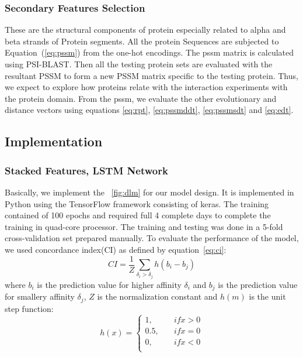 \subsubsection{Secondary Features Selection}
These are the structural components of protein especially related to alpha and beta strands of Protein segments. All the protein Sequences are subjected to Equation~(\ref{eq:pssm}) from the one-hot encodings. The \acrshort{pssm} matrix is calculated using PSI-BLAST\cite{Schaffer2001}. Then all the testing protein sets are evaluated with the resultant PSSM to form a new PSSM matrix specific to the testing protein. Thus, we expect to explore how proteins relate with the interaction experiments with the protein domain. From the \acrshort{pssm}, we evaluate the other evolutionary and distance vectors using equations \ref{eq:rpt}, \ref{eq:pssmddt}, \ref{eq:pssmsdt} and \ref{eq:edt}.

\subsection{Implementation}

\subsubsection{Stacked Features, LSTM Network}
Basically, we implement the ~\ref{fig:dlm} for our model design. It is implemented in Python using the TensorFlow framework consisting of keras. The training contained of 100 epochs and required full 4 complete days to complete the training in quad-core processor. The training and testing was done in a 5-fold cross-validation set prepared manually. To evaluate the performance of the model, we used concordance index(CI)\cite{Xu2015} as defined by equation~\ref{eq:ci}:
\begin{equation}
    CI = \frac{1}{Z} \sum_{\delta_i > \delta_j} h(b_i - b_j)
    \label{eq:ci}
\end{equation}
where $b_i$ is the prediction value for higher affinity $\delta_i$ and $b_j$ is the prediction value for smallery affinity $\delta_j$, $Z$ is the normalization constant and $h(m)$ is the unit step function:
\begin{equation} h(x) = 
    \begin{cases}
        1,& \quad {if x>0} \\
        0.5, & \quad{ if x=0 } \\
        0, & \quad{if x<0} \\
    \end{cases}
\end{equation}

